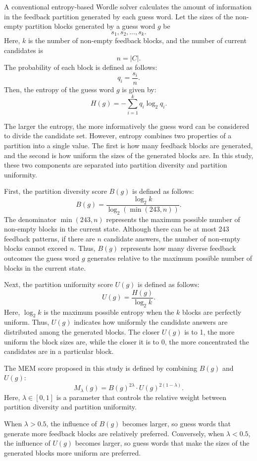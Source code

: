 \documentclass[11pt]{article}
\begin{document}
A conventional entropy-based Wordle solver calculates the amount of information in the feedback partition generated by each guess word.
Let the sizes of the non-empty partition blocks generated by a guess word $g$ be
\[
s_1, s_2, \ldots, s_k.
\]
Here, $k$ is the number of non-empty feedback blocks, and the number of current candidates is
\[
n = |C|.
\]
The probability of each block is defined as follows:
\[
q_i = \frac{s_i}{n}.
\]
Then, the entropy of the guess word $g$ is given by:
\[
H(g) = - \sum_{i=1}^{k} q_i \log_2 q_i.
\]

The larger the entropy, the more informatively the guess word can be considered to divide the candidate set.
However, entropy combines two properties of a partition into a single value.
The first is how many feedback blocks are generated, and the second is how uniform the sizes of the generated blocks are.
In this study, these two components are separated into partition diversity and partition uniformity.

First, the partition diversity score $B(g)$ is defined as follows:
\[
B(g) =
\frac{\log_2 k}{\log_2(\min(243,n))}.
\]
The denominator $\min(243,n)$ represents the maximum possible number of non-empty blocks in the current state.
Although there can be at most 243 feedback patterns, if there are $n$ candidate answers, the number of non-empty blocks cannot exceed $n$.
Thus, $B(g)$ represents how many diverse feedback outcomes the guess word $g$ generates relative to the maximum possible number of blocks in the current state.

Next, the partition uniformity score $U(g)$ is defined as follows:
\[
U(g) =
\frac{H(g)}{\log_2 k}.
\]
Here, $\log_2 k$ is the maximum possible entropy when the $k$ blocks are perfectly uniform.
Thus, $U(g)$ indicates how uniformly the candidate answers are distributed among the generated blocks.
The closer $U(g)$ is to 1, the more uniform the block sizes are, while the closer it is to 0, the more concentrated the candidates are in a particular block.

The MEM score proposed in this study is defined by combining $B(g)$ and $U(g)$:
\[
M_{\lambda}(g)
=
B(g)^{2\lambda}
\cdot
U(g)^{2(1-\lambda)}.
\]
Here, $\lambda \in [0,1]$ is a parameter that controls the relative weight between partition diversity and partition uniformity.

When $\lambda > 0.5$, the influence of $B(g)$ becomes larger, so guess words that generate more feedback blocks are relatively preferred.
Conversely, when $\lambda < 0.5$, the influence of $U(g)$ becomes larger, so guess words that make the sizes of the generated blocks more uniform are preferred.
\end{document}
